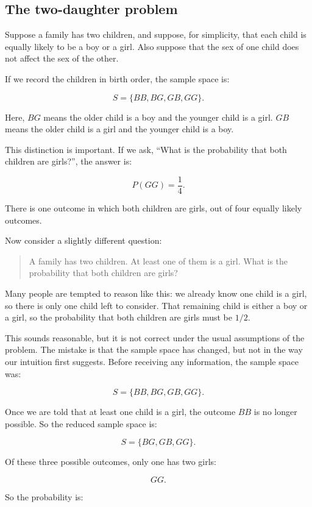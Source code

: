 \documentclass[
  letterpaper,
  DIV=11,
  numbers=noendperiod]{scrreprt}
\begin{document}
\subsection{The two-daughter problem}\label{the-two-daughter-problem}

Suppose a family has two children, and suppose, for simplicity, that
each child is equally likely to be a boy or a girl. Also suppose that
the sex of one child does not affect the sex of the other.

If we record the children in birth order, the sample space is:

\[
S = \{BB, BG, GB, GG\}.
\]

Here, \(BG\) means the older child is a boy and the younger child is a
girl. \(GB\) means the older child is a girl and the younger child is a
boy.

This distinction is important. If we ask, ``What is the probability that
both children are girls?'', the answer is:

\[
P(GG) = \frac{1}{4}.
\]

There is one outcome in which both children are girls, out of four
equally likely outcomes.

Now consider a slightly different question:

\begin{quote}
A family has two children. At least one of them is a girl. What is the
probability that both children are girls?
\end{quote}

Many people are tempted to reason like this: we already know one child
is a girl, so there is only one child left to consider. That remaining
child is either a boy or a girl, so the probability that both children
are girls must be \(1/2\).

This sounds reasonable, but it is not correct under the usual
assumptions of the problem. The mistake is that the sample space has
changed, but not in the way our intuition first suggests. Before
receiving any information, the sample space was:

\[
S = \{BB, BG, GB, GG\}.
\]

Once we are told that at least one child is a girl, the outcome \(BB\)
is no longer possible. So the reduced sample space is:

\[
S = \{BG, GB, GG\}.
\]

Of these three possible outcomes, only one has two girls:

\[
GG.
\]

So the probability is:
\end{document}
